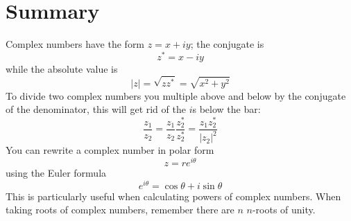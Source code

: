 \documentclass[12pt]{article}
\begin{document}
\section*{Summary}
Complex numbers have the form $z=x+iy$; the conjugate is
\begin{equation}
  z^*=x-iy
\end{equation}
while the absolute value is
\begin{equation}
  |z|=\sqrt{zz^*}=\sqrt{x^2+y^2}
\end{equation}
To divide two complex numbers you multiple above and below by the conjugate of the denominator, this will get rid of the $i$s below the bar:
\begin{equation}
  \frac{z_1}{z_2}=\frac{z_1}{z_2}\frac{z_2^*}{z_2^*}=\frac{z_1z_2^*}{|z_2|^2}
\end{equation}
You can rewrite a complex number in polar form
\begin{equation}
  z=re^{i\theta}
\end{equation}
using the Euler formula
\begin{equation}
  e^{i\theta}=\cos{\theta}+i\sin{\theta}
\end{equation}
This is particularly useful when calculating powers of complex
numbers. When taking roots of complex numbers, remember there are $n$
$n$-roots of unity.

  
\end{document}
